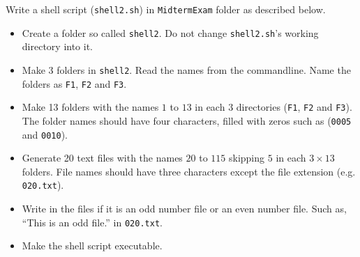\question[25]

Write a shell script (\texttt{shell2.sh}) in \texttt{MidtermExam} folder as described below.
\begin{itemize}
\item Create a folder so called \texttt{shell2}. Do not change \texttt{shell2.sh}'s working directory into it.
\item Make 3 folders in \texttt{shell2}. Read the names from the commandline. Name the folders as \texttt{F1}, \texttt{F2} and \texttt{F3}.
\item Make 13 folders with the names $1$ to $13$ in each $3$ directories (\texttt{F1}, \texttt{F2} and \texttt{F3}). The folder names should have four characters, filled with zeros such as (\texttt{0005} and \texttt{0010}). 
\item Generate 20 text files with the names $20$ to $115$ skipping $5$ in each $3\times13$ folders. File names should have three characters except the file extension (e.g. \texttt{020.txt}).
\item Write in the files if it is an odd number file or an even number file. Such as, ``This is an odd file.'' in \texttt{020.txt}.
\item Make the shell script executable.
\end{itemize}

